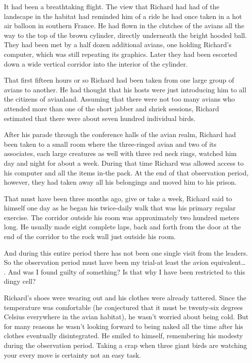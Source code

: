 \documentclass[]{article}
\begin{document}
{It had been a breathtaking flight.  The view that Richard had had of the landscape in the habitat had reminded him of a ride he had once taken in a hot air balloon in southern France.  He had flown in the clutches of the avians all the way to the top of the brown cylinder, directly underneath the bright hooded ball.  They had been met by a half dozen additional avians, one holding Richard’s computer, which was still repeating its graphics.  Later they had been escorted down a wide vertical corridor into the interior of the cylinder.

That first fifteen hours or so Richard had been taken from one large group of avians to another.  He had thought that his hosts were just introducing him to all the citizens of avianland.  Assuming that there were not too many avians who attended more than one of the short jabber and shriek sessions, Richard estimated that there were about seven hundred individual birds.

After his parade through the conference halls of the avian realm, Richard had been taken to a small room where the three-ringed avian and two of its associates, each large creatures as well with three red neck rings, watched him day and night for about a week.  During that time Richard was allowed access to his computer and all the items in-the pack.  At the end of that observation period, however, they had taken away all his belongings and moved him to his prison.

That must have been three months ago, give or take a week, Richard said to himself one day as he began his twice-daily walk that was his primary regular exercise.  The corridor outside his room was approximately two hundred meters long.  He usually made eight complete laps, back and forth from the door at the end of the corridor to the rock wall just outside his room.

And during this entire period there has not been one single visit from the leaders.  So the observation period must have been my trial-at least the avion equivalent… .  And was I found guilty of something? Is that why I have been restricted to this dingy cell?

Richard’s shoes were wearing out and his clothes were already tattered.  Since the temperature was comfortable (he conjectured that it must be twenty-six degrees Celsius everywhere in the avian habitat), he wasn’t worried about being cold.  But for many reasons he wasn’t looking forward to being naked all the time after his clothes eventually disintegrated.  He smiled to himself, remembering his modesty during the observation period.  Taking a crap when three giant birds are watching your every move is certainty not an easy task.

}
\end{document}
